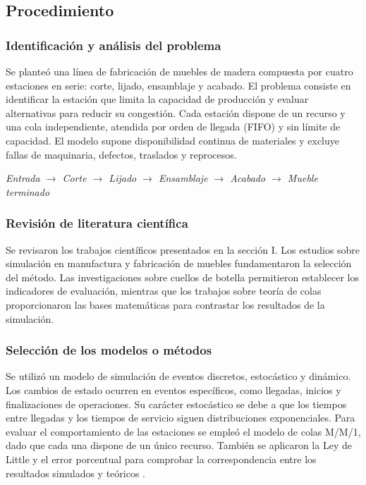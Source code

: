 \documentclass[conference,a4paper]{IEEEtran}
\begin{document}
\subsection{Procedimiento}

\subsubsection{Identificación y análisis del problema}
Se planteó una línea de fabricación de muebles de madera compuesta por cuatro estaciones en
serie: corte, lijado, ensamblaje y acabado. El problema consiste en identificar la estación
que limita la capacidad de producción y evaluar alternativas para reducir su congestión. Cada
estación dispone de un recurso y una cola independiente, atendida por orden de llegada
(FIFO) y sin límite de capacidad. El modelo supone disponibilidad continua de materiales y
excluye fallas de maquinaria, defectos, traslados y reprocesos.

\begin{center}
{\small\textit{Entrada $\rightarrow$ Corte $\rightarrow$ Lijado $\rightarrow$ Ensamblaje
$\rightarrow$ Acabado $\rightarrow$ Mueble terminado}}
\end{center}

\subsubsection{Revisión de literatura científica}
Se revisaron los trabajos científicos presentados en la sección I. Los estudios sobre
simulación en manufactura \cite{negahban2014,mourtzis2020} y fabricación de muebles
\cite{nouri2019,matrani2026,bambura2020} fundamentaron la selección del método. Las
investigaciones sobre cuellos de botella \cite{velumani2017,li2020} permitieron establecer
los indicadores de evaluación, mientras que los trabajos sobre teoría de colas
\cite{govil1999,wu2012,gross2008} proporcionaron las bases matemáticas para contrastar los
resultados de la simulación.

\subsubsection{Selección de los modelos o métodos}
Se utilizó un modelo de simulación de eventos discretos, estocástico y dinámico. Los cambios
de estado ocurren en eventos específicos, como llegadas, inicios y finalizaciones de
operaciones. Su carácter estocástico se debe a que los tiempos entre llegadas y los tiempos
de servicio siguen distribuciones exponenciales. Para evaluar el comportamiento de las
estaciones se empleó el modelo de colas M/M/1, dado que cada una dispone de un único
recurso. También se aplicaron la Ley de Little y el error porcentual para comprobar la
correspondencia entre los resultados simulados y teóricos \cite{gross2008}.
\end{document}
